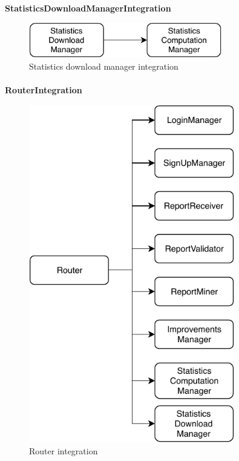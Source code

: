			\paragraph{}
				\textbf{StatisticsDownloadManagerIntegration}
					\begin{figure}[!h]
						\centering
						\includegraphics[width=0.75\textwidth]{images/Integration/StatisticsDownloadManagerIntegration.pdf}
						\caption{Statistics download manager integration}
					\end{figure}
			\clearpage
			\paragraph{}
				\textbf{RouterIntegration}
					\begin{figure}[!h]
						\centering
						\includegraphics[width=0.8\textwidth]{images/Integration/RouterIntegration.pdf}
						\caption{Router integration}
					\end{figure}
			\clearpage

